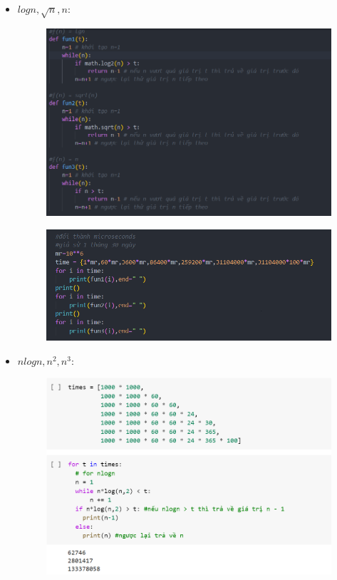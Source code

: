 \documentclass[10pt,a4paper]{article}
\begin{document}
\begin{itemize}
    \item $logn, \sqrt{n}, n: $
     \begin{figure}[H]
        \centering
        \includegraphics[scale=0.75]{images/2.1.png}
    \end{figure}
     \begin{figure}[H]
        \centering
        \includegraphics[scale=0.75]{images/2.1.b.png}
    \end{figure}
    \item $nlogn, n^2, n^3: $
     \begin{figure}[H]
        \centering
        \includegraphics[scale=0.75]{images/nlogn.png}

\end{figure}
\end{itemize}
\end{document}
